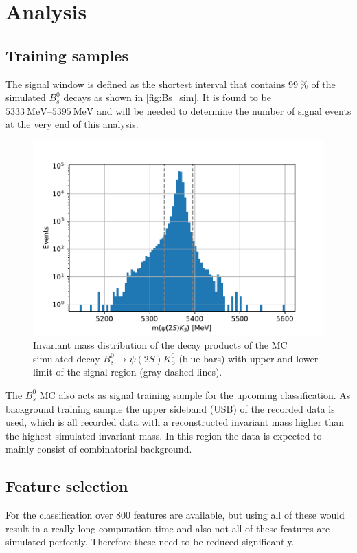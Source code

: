 \section{Analysis}\label{sec:analysis}

\subsection{Training samples}
The signal window is defined as the shortest interval that contains $\SI{99}{\percent}$ of the simulated $B^0_s$ decays as shown in \autoref{fig:Bs_sim}.
It is found to be $\SIrange{5333}{5395}{\mega\eV}$ and will be needed to determine the number of signal events at the very end of this analysis.

\begin{figure}[H]
  \centering
  \includegraphics[width=12cm]{plots/sim_hist_limits.pdf}
  \caption{Invariant mass distribution of the decay products of the MC simulated decay $B^0_s \to \psi(2S)K^0_\mathrm{S}$ (blue bars) with upper and lower limit of the signal region (gray dashed lines).}
  \label{fig:Bs_sim}
\end{figure}

The $B^0_s$ MC also acts as signal training sample for the upcoming classification. As background training sample the upper sideband (USB) of the recorded data is used, which is all recorded data with a reconstructed invariant mass higher than the highest simulated invariant mass. In this region the data is expected to mainly consist of combinatorial background.

\subsection{Feature selection}
For the classification over $\num{800}$ features are available, but using all of these would result in a really long computation time and also not all of these features are simulated perfectly. Therefore these need to be reduced significantly.

